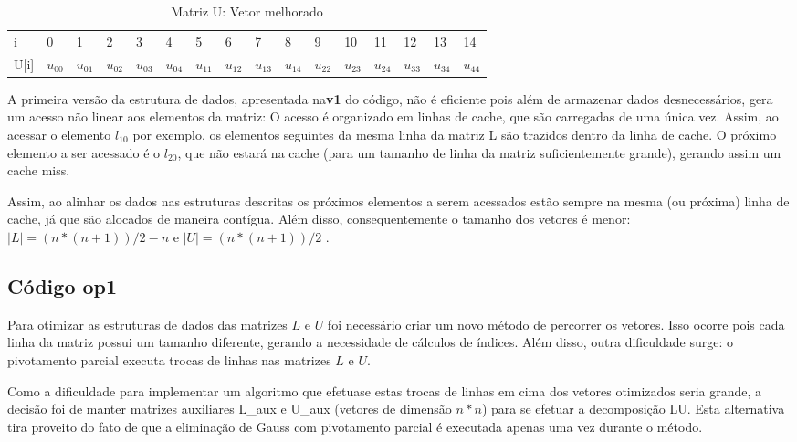 \documentclass[12pt]{article}
\begin{document}
\begin{table}[H]
\caption{Matriz U: Vetor melhorado}
\label{my-label}
\begin{tabular}{l|l|l|l|l|l|l|l|l|l|l|l|l|l|l|l|}
\cline{2-16}
i   & 0      & 1      & 2      & 3      & 4      & 5      & 6      & 7      & 8      & 9   & 10  & 11  & 12  & 13  & 14 \\ \cline{2-16}
U[i] & $u_{00}$ & $u_{01}$ & $u_{02}$ & $u_{03}$ & $u_{04}$ & $u_{11}$ & $u_{12}$ & $u_{13}$ & $u_{14}$ & $u_{22}$ & $u_{23}$ & $u_{24}$ & $u_{33}$ & $u_{34}$ & $u_{44}$ \\ \cline{2-16}
\end{tabular}
\end{table}

A primeira versão da estrutura de dados, apresentada na\textbf{v1} do código, não é eficiente pois além de armazenar dados desnecessários, gera um acesso não linear aos elementos da matriz: O acesso é organizado em linhas de cache, que são carregadas de uma única vez. Assim, ao acessar o elemento $l_{10}$ por exemplo, os elementos seguintes da mesma linha da matriz L são trazidos dentro da linha de cache. O próximo elemento a ser acessado é o $l_{20}$, que não estará na cache (para um tamanho de linha da matriz suficientemente grande), gerando assim um cache miss.

Assim, ao alinhar os dados nas estruturas descritas os próximos elementos a serem acessados estão sempre na mesma (ou próxima) linha de cache, já que são alocados de maneira contígua. Além disso, consequentemente o tamanho dos vetores é menor: $|L| = (n * (n+1)) / 2 - n$ e $|U| = (n * (n+1)) / 2$ .


\subsection{Código op1}

Para otimizar as estruturas de dados das matrizes $L$ e $U$ foi necessário criar um novo método de percorrer os vetores. Isso ocorre pois cada linha da matriz possui um tamanho diferente, gerando a necessidade de cálculos de índices. Além disso, outra dificuldade surge: o pivotamento parcial executa trocas de linhas nas matrizes $L$ e $U$.

Como a dificuldade para implementar um algoritmo que efetuase estas trocas de linhas em cima dos vetores otimizados seria grande, a decisão foi de manter matrizes auxiliares L\_aux e U\_aux (vetores de dimensão $n * n$) para se efetuar a decomposição LU. Esta alternativa tira proveito do fato de que a eliminação de Gauss com pivotamento parcial é executada apenas uma vez durante o método.
\end{document}
